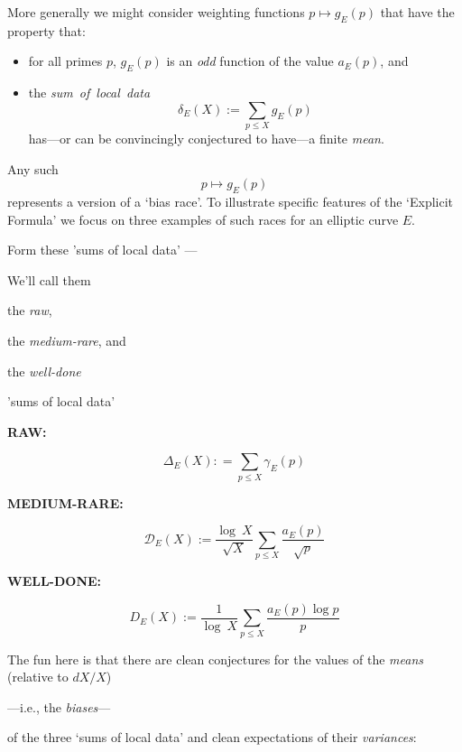 \documentclass[12pt]{beamer}
\theoremstyle{definition}
\begin{document}
\begin{frame}
  More generally we might consider  weighting functions $p \mapsto g_E(p)$ that have the property that:

  \begin{itemize} \item for all primes $p$, $g_E(p)$ is an {\it odd} function of the value  $a_E(p)$, and \vskip20pt \item the {\it sum\ of\ local\ data}  $$\delta_E(X):=\sum_{p\le X}g_E(p)$$ has---or can be convincingly conjectured to have---a finite  {\it mean}.
  \end{itemize}

\end{frame}
\begin{frame}\vskip20pt
{\Large \vskip40pt
Any such  $$p \mapsto  g_E(p)$$ represents a version of a `bias race'.
\vskip20pt
To illustrate specific features of the `Explicit Formula' we focus on three examples of such races for an elliptic curve $E$. }\end{frame}
\begin{frame}\vskip20pt
{\Large  \vskip20pt  Form  these 'sums of local data' ---\vskip20pt

We'll call them \vskip10pt  \centerline{the {\it raw},}\vskip10pt  \centerline{the {\it medium-rare}, and }\vskip10pt \centerline{the {\it well-done}}\vskip20pt 'sums of local data' }\end{frame}
\begin{frame}\vskip20pt
{\Large  \vskip20pt
 \centerline{\bf RAW:} \vskip20pt  $$\Delta_E(X): =\sum_{p\le X}\gamma_E(p)$$} \end{frame}
\begin{frame}\vskip20pt
{\Large  \vskip20pt
 \centerline{\bf MEDIUM-RARE:}  \vskip20pt$${\mathcal D}_E(X):= {\frac{\log\ X}{\sqrt X}}\sum_{p \le X}{\frac{a_E(p)}{\sqrt p}}$$} \end{frame}
\begin{frame}\vskip20pt
{\Large  \vskip20pt
  \centerline{\bf WELL-DONE:} \vskip20pt$${D}_E(X):= {\frac{1}{\log\ X}}\sum_{p \le X}{\frac{a_E(p)\log p}{ p}}$$} \end{frame}

 \begin{frame}\vskip20pt
{\Large  \vskip20pt

   The fun here is that there are clean conjectures for\vskip20pt the values of the {\it means} (relative to $dX/X$)\vskip20pt \centerline{---i.e., the {\it biases}---}\vskip20pt of the three `sums of local data' \vskip20pt and clean expectations of their {\it variances}:} \end{frame}
\end{document}
